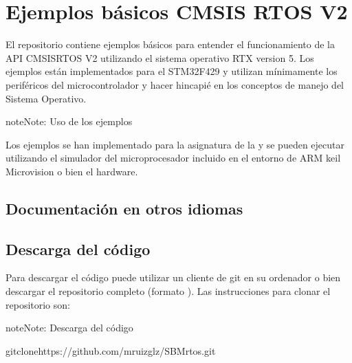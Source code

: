 \documentclass[letterpaper,10pt,english]{sphinxmanual}
\begin{document}
\sphinxstepscope


\chapter{Ejemplos básicos CMSIS RTOS V2}
\label{\detokenize{cmsis-rtos:ejemplos-basicos-cmsis-rtos-v2}}\label{\detokenize{cmsis-rtos:cmsis-rtos}}\label{\detokenize{cmsis-rtos::doc}}
\sphinxAtStartPar
El repositorio contiene ejemplos básicos para entender el funcionamiento de la API CMSIS\sphinxhyphen{}RTOS V2 utilizando el sistema operativo RTX version 5. Los ejemplos están implementados para el STM32F429 y utilizan mínimamente los periféricos del microcontrolador y hacer hincapié en los conceptos de manejo del Sistema Operativo.

\begin{sphinxadmonition}{note}{Note:}
\sphinxAtStartPar
Uso de los ejemplos

\sphinxAtStartPar
Los ejemplos se han implementado para la asignatura  de la  y se pueden ejecutar utilizando el simulador del microprocesador incluido en el entorno de ARM keil Microvision o bien el hardware.
\end{sphinxadmonition}


\section{Documentación en otros idiomas}
\label{\detokenize{cmsis-rtos:documentacion-en-otros-idiomas}}
\sphinxAtStartPar
{}


\section{Descarga del código}
\label{\detokenize{cmsis-rtos:descarga-del-codigo}}
\sphinxAtStartPar
Para descargar el código puede utilizar un cliente de git en su ordenador o bien descargar el repositorio completo (formato ). Las instrucciones para clonar el repositorio son:

\begin{sphinxadmonition}{note}{Note:}
\sphinxAtStartPar
Descarga del código

\begin{sphinxVerbatim}[commandchars=\\\{\}]
\PYGZdl{}gitclonehttps://github.com/mruizglz/SBM\PYGZhy{}rtos.git
\end{sphinxVerbatim}
\end{sphinxadmonition}
\end{document}
